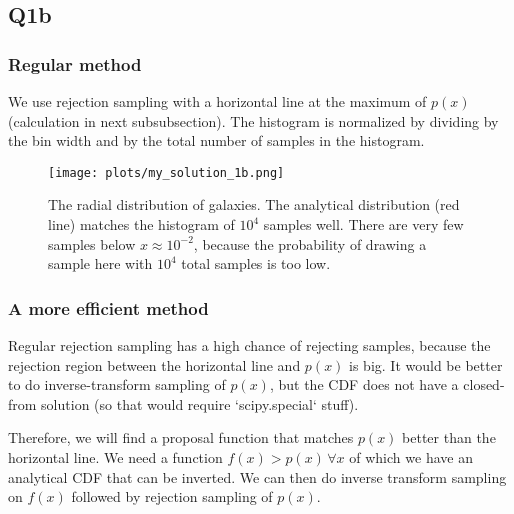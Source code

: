 \subsection{Q1b}

\subsubsection{Regular method}

We use rejection sampling with a horizontal line at the maximum of $p(x)$ (calculation in next subsubsection).
The histogram is normalized by dividing by the bin width and by the total number of samples in the histogram.

\begin{figure}[H]
    \centering
    \texttt{[image: plots/my\_solution\_1b.png]}
    \caption{The radial distribution of galaxies. The analytical distribution (red line) matches the histogram
    of $10^4$ samples well. There are very few samples below $x \approx 10^{-2}$, because the probability of
    drawing a sample here with $10^4$ total samples is too low.
    }
\end{figure}


\subsubsection{A more efficient method}
Regular rejection sampling has a high chance of rejecting samples, because the rejection region between the
horizontal line and $p(x)$ is big. It would be better to do inverse-transform sampling of $p(x)$, but the
CDF does not have a closed-from solution (so that would require `scipy.special` stuff).

Therefore, we will find a proposal function that matches $p(x)$ better than the horizontal line. We need
a function $f(x) > p(x) \, \forall x$ of which we have an analytical CDF that 
can be inverted. We can then do inverse transform sampling on $f(x)$ followed by rejection sampling of $p(x)$.

